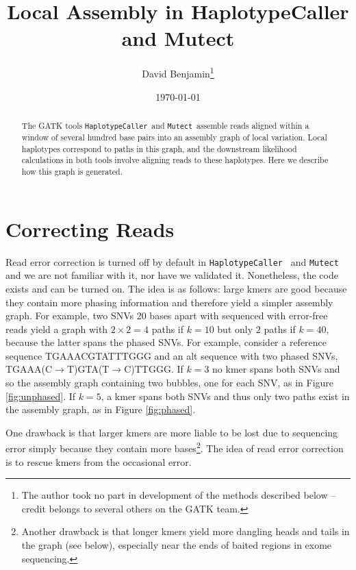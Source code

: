\documentclass[nofootinbib,amssymb,amsmath]{revtex4}
\newcommand{\HC}{\texttt{HaplotypeCaller}}
\newcommand{\Mutect}{\texttt{Mutect}}
\begin{document}
\title{Local Assembly in HaplotypeCaller and Mutect}
\author{David Benjamin\footnote{The author took no part in development of the methods described below -- credit belongs to several others on the GATK team. }}

\date{\today}

\begin{abstract}
The GATK tools \HC~and \Mutect~assemble reads aligned within a window of several hundred base pairs into an assembly graph of local variation.  Local haplotypes correspond to paths in this graph, and the downstream likelihood calculations in both tools involve aligning reads to these haplotypes.  Here we describe how this graph is generated.
\end{abstract}

\maketitle

\section{Correcting Reads} \label{correcting-reads}
Read error correction is turned off by default in \HC~ and \Mutect~ and we are not familiar with it, nor have we validated it.  Nonetheless, the code exists and can be turned on.  The idea is as follows: large kmers are good because they contain more phasing information and therefore yield a simpler assembly graph.  For example, two SNVs 20 bases apart with sequenced with error-free reads yield a graph with $2 \times 2 = 4$ paths if $k = 10$ but only $2$ paths if $k = 40$, because the latter spans the phased SNVs.  For example, consider a reference sequence TGAAACGTATTTGGG and an alt sequence with two phased SNVs, TGAAA(C$\rightarrow$T)GTA(T$\rightarrow$C)TTGGG.  If $k=3$ no kmer spans both SNVs and so the assembly graph containing two bubbles, one for each SNV, as in Figure \ref{fig:unphased}.  If $k = 5$, a kmer spans both SNVs and thus only two paths exist in the assembly graph, as in Figure \ref{fig:phased}.

One drawback is that larger kmers are more liable to be lost due to sequencing error simply because they contain more bases\footnote{Another drawback is that longer kmers yield more dangling heads and tails in the graph (see below), especially near the ends of baited regions in exome sequencing.}.  The idea of read error correction is to rescue kmers from the occasional error.
\end{document}
